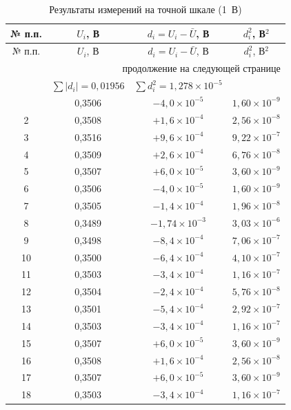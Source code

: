 \documentclass[12pt,a4paper]{article}
\begin{document}
\begin{longtable}{cccc}
\caption{Результаты измерений на точной шкале (1~В)}
\label{tab:fine} \\
\toprule
№ п.п. & $U_i$, В & $d_i = U_i - \bar{U}$, В & $d_i^2$, В$^2$ \\
\midrule
\endfirsthead
\toprule
№ п.п. & $U_i$, В & $d_i = U_i - \bar{U}$, В & $d_i^2$, В$^2$ \\
\midrule
\endhead
\midrule
\multicolumn{4}{r}{\small продолжение на следующей странице} \\
\endfoot
\bottomrule
\multicolumn{2}{l}{$\bar{U} = \sum U_i / n = 0{,}35064$ В} &
$\sum|d_i| = 0{,}01956$ &
$\sum d_i^2 = 1{,}278\times10^{-5}$ \\
\endlastfoot
1  & 0,3506 & $-4{,}0\times10^{-5}$  & $1{,}60\times10^{-9}$ \\
2  & 0,3508 & $+1{,}6\times10^{-4}$  & $2{,}56\times10^{-8}$ \\
3  & 0,3516 & $+9{,}6\times10^{-4}$  & $9{,}22\times10^{-7}$ \\
4  & 0,3509 & $+2{,}6\times10^{-4}$  & $6{,}76\times10^{-8}$ \\
5  & 0,3507 & $+6{,}0\times10^{-5}$  & $3{,}60\times10^{-9}$ \\
6  & 0,3506 & $-4{,}0\times10^{-5}$  & $1{,}60\times10^{-9}$ \\
7  & 0,3505 & $-1{,}4\times10^{-4}$  & $1{,}96\times10^{-8}$ \\
8  & 0,3489 & $-1{,}74\times10^{-3}$ & $3{,}03\times10^{-6}$ \\
9  & 0,3498 & $-8{,}4\times10^{-4}$  & $7{,}06\times10^{-7}$ \\
10 & 0,3500 & $-6{,}4\times10^{-4}$  & $4{,}10\times10^{-7}$ \\
11 & 0,3503 & $-3{,}4\times10^{-4}$  & $1{,}16\times10^{-7}$ \\
12 & 0,3504 & $-2{,}4\times10^{-4}$  & $5{,}76\times10^{-8}$ \\
13 & 0,3501 & $-5{,}4\times10^{-4}$  & $2{,}92\times10^{-7}$ \\
14 & 0,3503 & $-3{,}4\times10^{-4}$  & $1{,}16\times10^{-7}$ \\
15 & 0,3507 & $+6{,}0\times10^{-5}$  & $3{,}60\times10^{-9}$ \\
16 & 0,3508 & $+1{,}6\times10^{-4}$  & $2{,}56\times10^{-8}$ \\
17 & 0,3507 & $+6{,}0\times10^{-5}$  & $3{,}60\times10^{-9}$ \\
18 & 0,3503 & $-3{,}4\times10^{-4}$  & $1{,}16\times10^{-7}$ \\

\end{longtable}
\end{document}
